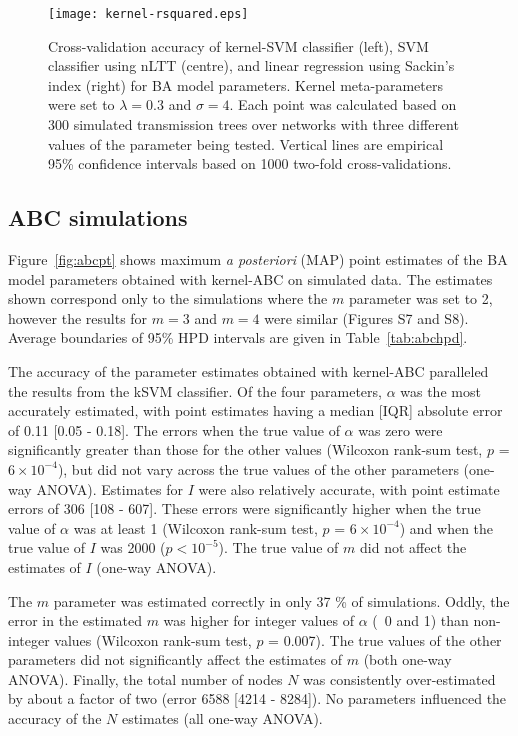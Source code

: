 \documentclass[nogrid]{MBE}
\begin{document}
\begin{figure*}[ht]
  \centering
  \texttt{[image: kernel-rsquared.eps]}
  \vspace{6pt}
  \caption{
      Cross-validation accuracy of kernel-SVM classifier (left), SVM classifier
      using nLTT (centre), and linear regression using Sackin's index
      (right) for BA model parameters. Kernel meta-parameters were set to
      $\lambda = 0.3$ and $\sigma = 4$. Each point was calculated based on 300
      simulated transmission trees over networks with three different values of
      the parameter being tested. Vertical lines are empirical 95\% confidence
      intervals based on 1000 two-fold cross-validations.
  }
  \label{fig:rsquared}
\end{figure*}

\subsection{ABC simulations}



Figure~\ref{fig:abcpt} shows maximum \textit{a posteriori} (MAP) point
estimates of the BA model parameters obtained with kernel-ABC on simulated
data. The estimates shown correspond only to the simulations where the $m$
parameter was set to 2, however the results for $m = 3$ and $m = 4$ were
similar (Figures S7 and S8). Average boundaries of 95\% HPD intervals are given
in Table~\ref{tab:abchpd}.

The accuracy of the parameter estimates obtained with kernel-ABC
paralleled the results from the kSVM classifier. Of the four parameters,
$\alpha$ was the most accurately estimated, with point estimates having a
median [IQR] absolute error of 
    0.11 
    [0.05 - 
    0.18].
The errors when the true value of $\alpha$ was zero were significantly greater
than those for the other values 
    (Wilcoxon rank-sum test, $p$ = $6\!\times\!10^{-4}$),
but did not vary across the true values of the other parameters (one-way
ANOVA). Estimates for $I$ were also relatively accurate, with point estimate
errors of
    306 
    [108 - 
    607].
These errors were significantly higher when the true value of $\alpha$ was
at least 1
    (Wilcoxon rank-sum test, $p$ = $6\!\times\!10^{-4}$)
and when the true value of $I$ was 2000 ($p < 10^{-5}$). The true value of $m$
did not affect the estimates of $I$ (one-way ANOVA).

The $m$ parameter was estimated correctly in only
    37 \%
of simulations. Oddly, the error in the estimated $m$ was higher for integer
values of $\alpha$ (~0 and 1) than non-integer values 
    (Wilcoxon rank-sum test, $p$ = 0.007).
The true values of the other parameters did not significantly affect the
estimates of $m$ (both one-way ANOVA). Finally, the total number of nodes $N$
was consistently over-estimated by about a factor of two
    (error 6588 
    [4214 - 
     8284]).
No parameters influenced the accuracy of the $N$ estimates (all one-way ANOVA).
\end{document}
